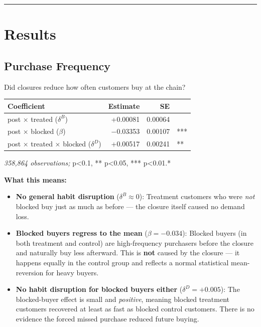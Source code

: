 \documentclass[
  letterpaper,
  DIV=11,
  numbers=noendperiod]{scrartcl}
\newcounter{none} %
\providecommand{\tightlist}{%
  \setlength{\itemsep}{0pt}\setlength{\parskip}{0pt}}
\begin{document}
\begin{center}\rule{0.5\linewidth}{0.5pt}\end{center}

\section{Results}\label{results}

\subsection{Purchase Frequency}\label{purchase-frequency}

Did closures reduce how often customers buy at the chain?

{\def\LTcaptype{none} %
\begin{longtable}[]{@{}lrrl@{}}
\toprule\noalign{}
Coefficient & Estimate & SE & \\
\midrule\noalign{}
\endhead
\bottomrule\noalign{}
\endlastfoot
post × treated (\(\delta^B\)) & +0.00081 & 0.00064 & \\
post × blocked (\(\beta\)) & −0.03353 & 0.00107 & *** \\
post × treated × blocked (\(\delta^D\)) & +0.00517 & 0.00241 & ** \\
\end{longtable}
}

\emph{358,864 observations; } p\textless0.1, ** p\textless0.05, ***
p\textless0.01.*

\textbf{What this means:}

\begin{itemize}
\tightlist
\item
  \textbf{No general habit disruption} (\(\delta^B \approx 0\)):
  Treatment customers who were \emph{not} blocked buy just as much as
  before --- the closure itself caused no demand loss.
\item
  \textbf{Blocked buyers regress to the mean} (\(\beta = -0.034\)):
  Blocked buyers (in both treatment and control) are high-frequency
  purchasers before the closure and naturally buy less afterward. This
  is \textbf{not} caused by the closure --- it happens equally in the
  control group and reflects a normal statistical mean-reversion for
  heavy buyers.
\item
  \textbf{No habit disruption for blocked buyers either}
  (\(\delta^D = +0.005\)): The blocked-buyer effect is small and
  \emph{positive}, meaning blocked treatment customers recovered at
  least as fast as blocked control customers. There is no evidence the
  forced missed purchase reduced future buying.
\end{itemize}
\end{document}
